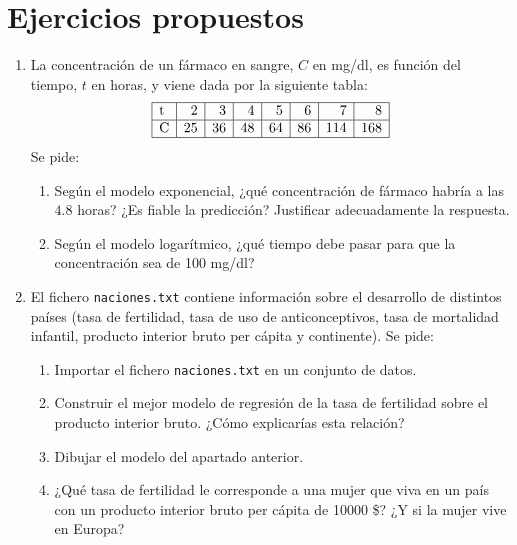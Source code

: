 \begin{enumerate}[leftmargin=*]
\end{enumerate}


\section{Ejercicios propuestos}
\begin{enumerate}[leftmargin=*]
\item La concentración de un fármaco en sangre, $C$ en mg/dl, es función del tiempo, $t$ en horas, y viene dada por la
siguiente tabla: 
\[
\begin{array}{|l|r|r|r|r|r|r|r|}
\hline
\text{t} & 2 & 3 & 4 & 5 & 6 & 7 & 8\\
\hline
\text{C} & 25 & 36 & 48 & 64 & 86 & 114 & 168\\
\hline
\end{array}
\]
Se pide: 
\begin{enumerate}
\item Según el modelo exponencial, ¿qué concentración de fármaco habría a las $4.8$ horas? ¿Es fiable la predicción?
Justificar adecuadamente la respuesta.
\item Según el modelo logarítmico, ¿qué tiempo debe pasar para que la concentración sea de 100 mg/dl?
\end{enumerate}

\item El fichero \texttt{naciones.txt} contiene información sobre el desarrollo de distintos países (tasa de fertilidad, tasa de uso de
anticonceptivos, tasa de mortalidad infantil, producto interior bruto per cápita y continente). 
Se pide:
\begin{enumerate}
\item Importar el fichero \texttt{naciones.txt} en un conjunto de datos.
\item Construir el mejor modelo de regresión de la tasa de fertilidad sobre el producto interior bruto. ¿Cómo
explicarías esta relación?
\item Dibujar el modelo del apartado anterior.
\item ¿Qué tasa de fertilidad le corresponde a una mujer que viva en un país con un producto interior bruto per cápita
de 10000 \$? ¿Y si la mujer vive en Europa?
\end{enumerate}

\end{enumerate}